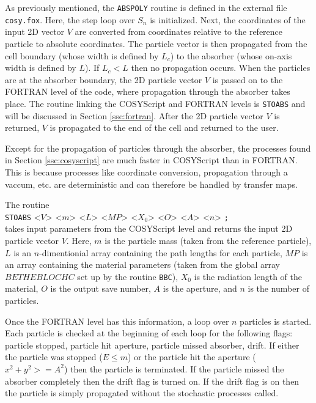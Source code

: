 \label{ssc:cosyscript}

As previously mentioned, the \texttt{ABSPOLY} routine is defined in the external file \texttt{cosy.fox}. Here, the step loop over $S_n$ is initialized. Next, the coordinates of the input 2D vector $V$ are converted from coordinates relative to the reference particle to absolute coordinates. The particle vector is then propagated from the cell boundary (whose width is defined by $L_c$) to the absorber (whose on-axis width is defined by $L$). If $L_c<L$ then no propagation occurs. When the particles are at the absorber boundary, the 2D particle vector $V$ is passed on to the FORTRAN level of the code, where propagation through the absorber takes place. The routine linking the COSYScript and FORTRAN levels is \texttt{STOABS} and will be discussed in Section \ref{ssc:fortran}. After the 2D particle vector $V$ is returned, $V$ is propagated to the end of the cell and returned to the user.

\label{ssc:fortran}
Except for the propagation of particles through the absorber, the processes found in Section \ref{ssc:cosyscript} are much faster in COSYScript than in FORTRAN. This is because processes like coordinate conversion, propagation through a vaccum, etc. are deterministic and can therefore be handled by transfer maps.

The routine\\
\texttt{STOABS} <$V$> <$m$> <$L$> <$MP$> <$X_0$> <$O$> <$A$> <$n$> \texttt{;} \\
takes input parameters from the COSYScript level and returns the input 2D particle vector $V$. Here, $m$ is the particle mass (taken from the reference particle), $L$ is an $n$-dimentionial array containing the path lengths for each particle, $MP$ is an array containing the material parameters (taken from the global array $BETHEBLOCHC$ set up by the routine \texttt{BBC}), $X_0$ is the radiation length of the material, $O$ is the output save number, $A$ is the aperture, and $n$ is the number of particles.

Once the FORTRAN level has this information, a loop over $n$ particles is started. Each particle is checked at the beginning of each loop for the following flags: particle stopped, particle hit aperture, particle missed absorber, drift. If either the particle was stopped ($E\leq m$) or the particle hit the aperture ($x^2+y^2>=A^2$) then the particle is terminated. If the particle missed the absorber completely then the drift flag is turned on. If the drift flag is on then the particle is simply propagated without the stochastic processes called.


